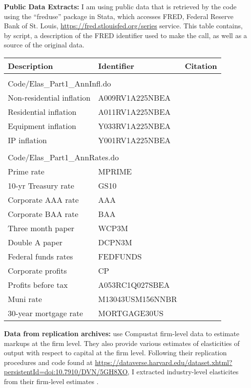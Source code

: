\documentclass[
]{article}
\begin{document}
\textbf{Public Data Extracts:}
I am using public data that is retrieved by the code using the ``freduse'' package in Stata, which accesses FRED, Federal Reserve Bank of St. Louis, \url{https://fred.stlouisfed.org/series} service. This table contains, by script, a description of the FRED identifier used to make the call, as well as a source of the original data.

\begin{longtable}{p{2in}p{1.5in}p{2.5in}}
Description & Identifier & Citation \\
\midrule
\\
\multicolumn{3}{l}{Code/Elas\_Part1\_AnnInfl.do} \\ \midrule
Non-residential inflation & A009RV1A225NBEA &  \cite{fedint}\\
Residential inflation & A011RV1A225NBEA & \cite{fedint}\\
Equipment inflation & Y033RV1A225NBEA  &  \cite{fedint}\\
IP inflation & Y001RV1A225NBEA  &  \cite{fedint} \\
\\
\multicolumn{3}{l}{Code/Elas\_Part1\_AnnRates.do} \\ \midrule
Prime rate & MPRIME &  \cite{fedint}\\
10-yr Treasury rate & GS10 & \cite{fedint}\\
Corporate AAA rate & AAA  &  \cite{moodys}\\
Corporate BAA rate & BAA  &  \cite{moodys} \\
Three month paper & WCP3M  &  \cite{moodys} \\
Double A paper & DCPN3M  &  \cite{moodys} \\
Federal funds rates & FEDFUNDS  &  \cite{fedint} \\
Corporate profits &  CP & \cite{beaimap} \\
Profits before tax &  A053RC1Q027SBEA & \cite{beaimap} \\
Muni rate &  M13043USM156NNBR & \cite{moodys} \\
30-year mortgage rate &  MORTGAGE30US & \cite{moodys} \\
\end{longtable}

\textbf{Data from replication archives:}
\cite{dleu2020} use Compustat firm-level data to estimate markups at the firm level. They also provide various estimates of elasticities of output with respect to capital at the firm level. Following their replication procedures and code found at \url{https://dataverse.harvard.edu/dataset.xhtml?persistentId=doi:10.7910/DVN/5GH8XO}, I extracted industry-level elasticites from their firm-level estimates \citep{dleudata2020}.
\end{document}
